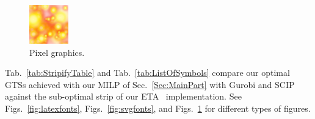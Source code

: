 \begin{figure}
    \centering
    \includegraphics[width=\columnwidth]{imgs/img.png}
    \caption{Pixel graphics.}\label{fig:pixel}
\end{figure}

Tab.~\ref{tab:StripifyTable} and Tab.~\ref{tab:ListOfSymbols} compare our optimal \acp{GTS} achieved with our \ac{MILP} of Sec.~\ref{Sec:MainPart} with Gurobi and SCIP against the sub-optimal strip of our \ac{ETA}~\cite{porcu2006partitioning} implementation.
See Figs.~\ref{fig:latexfonts}, Figs.~\ref{fig:svgfonts}, and Figs.~\ref{fig:pixel} for different types of figures.